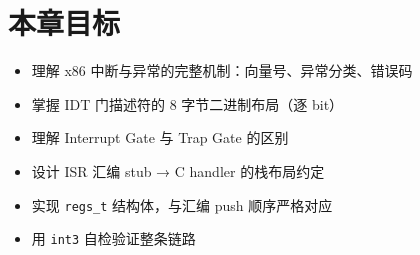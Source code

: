 \section{本章目标}

\begin{itemize}
  \item 理解 x86 中断与异常的完整机制：向量号、异常分类、错误码
  \item 掌握 IDT 门描述符的 8 字节二进制布局（逐 bit）
  \item 理解 Interrupt Gate 与 Trap Gate 的区别
  \item 设计 ISR 汇编 stub → C handler 的栈布局约定
  \item 实现 \texttt{regs\_t} 结构体，与汇编 push 顺序严格对应
  \item 用 \texttt{int3} 自检验证整条链路
\end{itemize}


